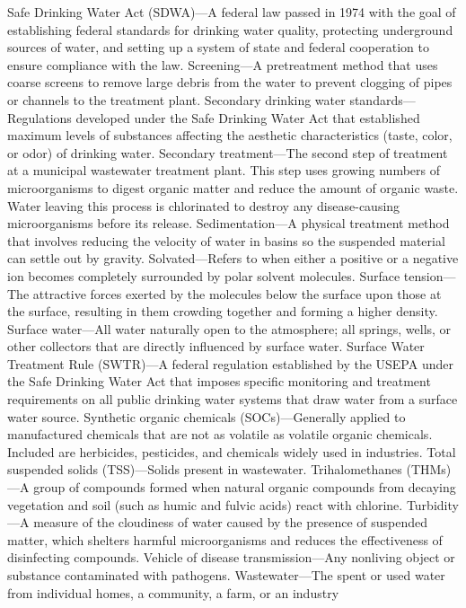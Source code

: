 \documentclass{article}
\begin{document}
Safe Drinking Water Act (SDWA)---A federal law passed in 1974 with the
goal of establishing federal standards for drinking water quality,
protecting underground sources of water, and setting up a system of
state and federal cooperation to ensure compliance with the law.
Screening---A pretreatment method that uses coarse screens to remove
large debris from the water to prevent clogging of pipes or channels to
the treatment plant. Secondary drinking water standards---Regulations
developed under the Safe Drinking Water Act that established maximum
levels of substances affecting the aesthetic characteristics (taste,
color, or odor) of drinking water. Secondary treatment---The second step
of treatment at a municipal wastewater treatment plant. This step uses
growing numbers of microorganisms to digest organic matter and reduce
the amount of organic waste. Water leaving this process is chlorinated
to destroy any disease-causing microorganisms before its release.
Sedimentation---A physical treatment method that involves reducing the
velocity of water in basins so the suspended material can settle out by
gravity. Solvated---Refers to when either a positive or a negative ion
becomes completely surrounded by polar solvent molecules. Surface
tension---The attractive forces exerted by the molecules below the
surface upon those at the surface, resulting in them crowding together
and forming a higher density. Surface water---All water naturally open
to the atmosphere; all springs, wells, or other collectors that are
directly influenced by surface water. Surface Water Treatment Rule
(SWTR)---A federal regulation established by the USEPA under the Safe
Drinking Water Act that imposes specific monitoring and treatment
requirements on all public drinking water systems that draw water from a
surface water source. Synthetic organic chemicals (SOCs)---Generally
applied to manufactured chemicals that are not as volatile as volatile
organic chemicals. Included are herbicides, pesticides, and chemicals
widely used in industries. Total suspended solids (TSS)---Solids present
in wastewater. Trihalomethanes (THMs)---A group of compounds formed when
natural organic compounds from decaying vegetation and soil (such as
humic and fulvic acids) react with chlorine. Turbidity---A measure of
the cloudiness of water caused by the presence of suspended matter,
which shelters harmful microorganisms and reduces the effectiveness of
disinfecting compounds. Vehicle of disease transmission---Any nonliving
object or substance contaminated with pathogens. Wastewater---The spent
or used water from individual homes, a community, a farm, or an industry
\end{document}
